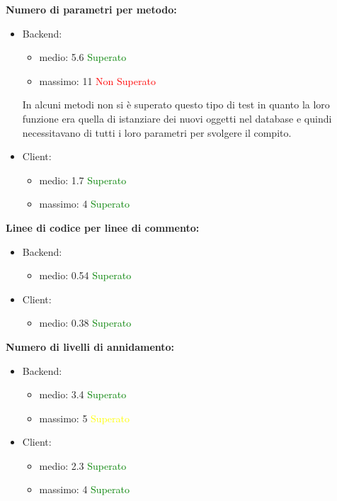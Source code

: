 \begin{description}
				\item \textbf{Numero di parametri per metodo:}
					\begin{itemize}
						\item Backend:
							\begin{itemize}
								\item medio: 5.6 \textcolor{green}{Superato}
								\item massimo: 11 \textcolor{red}{Non Superato}
							\end{itemize}
						In alcuni metodi non si è superato questo tipo di test in quanto la loro funzione era quella di istanziare dei nuovi oggetti nel database e quindi necessitavano di tutti i loro parametri per svolgere il compito.
						\item Client:
							\begin{itemize}
								\item medio: 1.7 \textcolor{green}{Superato}
								\item massimo: 4 \textcolor{green}{Superato}
							\end{itemize}
					\end{itemize}
					
				\item \textbf{Linee di codice per linee di commento:}
					\begin{itemize}
						\item Backend:
							\begin{itemize}
								\item medio: 0.54 \textcolor{green}{Superato}
							\end{itemize}
						\item Client:
							\begin{itemize}
								\item medio: 0.38 \textcolor{green}{Superato}
							\end{itemize}
					\end{itemize}
							
				\item \textbf{Numero di livelli di annidamento:}
					\begin{itemize}
						\item Backend:
							\begin{itemize}
								\item medio: 3.4 \textcolor{green}{Superato}
								\item massimo: 5 \textcolor{yellow}{Superato}
							\end{itemize}
						\item Client:
							\begin{itemize}
								\item medio: 2.3 \textcolor{green}{Superato}
								\item massimo: 4 \textcolor{green}{Superato}
							\end{itemize}
					\end{itemize}
					

\end{description}
